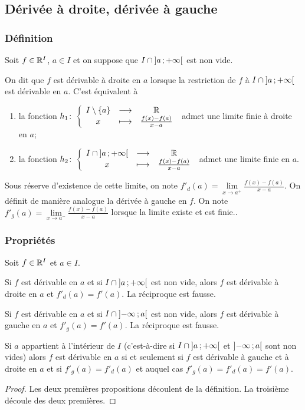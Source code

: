 \subsection{Dérivée à droite, dérivée à gauche}

\subsubsection{Définition}
Soit $f \in \mathbb{R}^I$, $a \in I$ et on suppose que $I \cap \left] a \, ;  +\infty \right[$ est non vide.
\begin{defdef}
  On dit que $f$ est dérivable à droite en $a$ lorsque la restriction de $f$ à $I \cap \left] a \, ;  +\infty \right[$ est dérivable en $a$. C'est équivalent à
  \begin{enumerate}
  \item la fonction $h_1\colon \left\{\begin{array}{ccc} I\setminus\{a\} & \longrightarrow &\mathbb{R}\\ x & \longmapsto & \frac{f(x)-f(a)}{x-a} \end{array} \right.$ admet une limite finie à droite en $a$;
  \item la fonction $h_2\colon \left\{\begin{array}{ccc} I \cap \left] a \, ;  +\infty \right[ & \longrightarrow &\mathbb{R}\\ x & \longmapsto & \frac{f(x)-f(a)}{x-a} \end{array} \right.$ admet une limite finie en $a$.
  \end{enumerate}
  Sous réserve d'existence de cette limite, on note $f'_d(a) = \lim\limits_{x \to a^+}\frac{f(x)-f(a)}{x-a}$. On définit de manière analogue la dérivée à gauche en $f$. On note $f'_g(a) = \lim\limits_{x \to a^-}\frac{f(x)-f(a)}{x-a}$ lorsque la limite existe et est finie..
\end{defdef}

\subsubsection{Propriétés}

Soit $f \in \mathbb{R}^I$ et $a \in I$.
\begin{prop}
  Si $f$ est dérivable en $a$ et si $I\cap \left] a \, ;  +\infty \right[$ est non vide, alors $f$ est dérivable à droite en $a$ et $f'_d(a)=f'(a)$. La réciproque est fausse.
\end{prop}
\begin{prop}
  Si $f$ est dérivable en $a$ et si $I\cap \left] -\infty \, ;  a \right[$ est non vide, alors $f$ est dérivable à gauche en $a$ et $f'_g(a)=f'(a)$. La réciproque est fausse.
\end{prop}
\begin{prop}
  Si $a$ appartient à l'intérieur de $I$ (c'est-à-dire si $I\cap \left] a \, ;  +\infty \right[$ et $\left] -\infty \, ;  a \right[$ sont non vides) alors $f$ est dérivable en $a$ si et seulement si $f$ est dérivable à gauche et à droite en $a$ et si $f'_g(a) = f'_d(a)$ et auquel cas $f'_g(a)=f'_d(a)=f'(a)$.
\end{prop}
\begin{proof}
  Les deux premières propositions découlent de la définition. La troisième découle des deux premières.
\end{proof}

